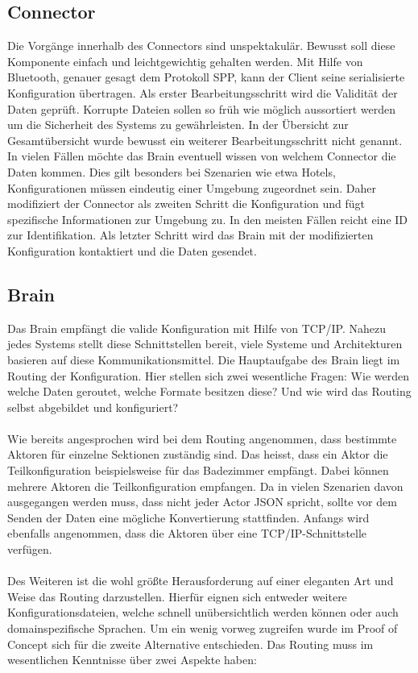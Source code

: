 \subsection{Connector}
Die Vorgänge innerhalb des Connectors sind unspektakulär. Bewusst soll diese Komponente einfach und leichtgewichtig gehalten werden. Mit Hilfe von Bluetooth, genauer gesagt dem Protokoll SPP, kann der Client seine serialisierte Konfiguration übertragen. Als erster Bearbeitungsschritt wird die Validität der Daten geprüft. Korrupte Dateien sollen so früh wie möglich aussortiert werden um die Sicherheit des Systems zu gewährleisten. In der Übersicht zur Gesamtübersicht wurde bewusst ein weiterer Bearbeitungsschritt nicht genannt. In vielen Fällen möchte das Brain eventuell wissen von welchem Connector die Daten kommen. Dies gilt besonders bei Szenarien wie etwa Hotels, Konfigurationen müssen eindeutig einer Umgebung zugeordnet sein. Daher modifiziert der Connector als zweiten Schritt die Konfiguration und fügt spezifische Informationen zur Umgebung zu. In den meisten Fällen reicht eine ID zur Identifikation. Als letzter Schritt wird das Brain mit der modifizierten Konfiguration kontaktiert und die Daten gesendet. 

\subsection{Brain}

Das Brain empfängt die valide Konfiguration mit Hilfe von TCP/IP. Nahezu jedes Systems stellt diese Schnittstellen bereit, viele Systeme und Architekturen basieren auf diese Kommunikationsmittel.
Die Hauptaufgabe des Brain liegt im Routing der Konfiguration. Hier stellen sich zwei wesentliche Fragen: Wie werden welche Daten geroutet, welche Formate besitzen diese? Und wie wird das Routing selbst abgebildet und konfiguriert? 
\\\\
Wie bereits angesprochen wird bei dem Routing angenommen, dass bestimmte Aktoren für einzelne Sektionen zuständig sind. Das heisst, dass ein Aktor die Teilkonfiguration beispielsweise für das Badezimmer empfängt. Dabei können mehrere Aktoren die Teilkonfiguration empfangen. Da in vielen Szenarien davon ausgegangen werden muss, dass nicht jeder Actor JSON spricht, sollte vor dem Senden der Daten eine mögliche Konvertierung stattfinden. Anfangs wird ebenfalls angenommen, dass die Aktoren über eine TCP/IP-Schnittstelle verfügen. 
\\\\
Des Weiteren ist die wohl größte Herausforderung auf einer eleganten Art und Weise das Routing darzustellen. Hierfür eignen sich entweder weitere Konfigurationsdateien, welche schnell unübersichtlich werden können oder auch domainspezifische Sprachen. Um ein wenig vorweg zugreifen wurde im Proof of Concept sich für die zweite Alternative entschieden. Das Routing muss im wesentlichen Kenntnisse über zwei Aspekte haben: 


